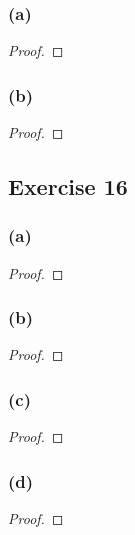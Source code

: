 \documentclass[14pt]{extarticle}
\begin{document}
\subsubsection{(a)}

\begin{proof}

\end{proof}

\subsubsection{(b)}

\begin{proof}

\end{proof}

\subsection{Exercise 16}

\subsubsection{(a)}

\begin{proof}

\end{proof}

\subsubsection{(b)}

\begin{proof}

\end{proof}

\subsubsection{(c)}

\begin{proof}

\end{proof}

\subsubsection{(d)}

\begin{proof}

\end{proof}
\end{document}
